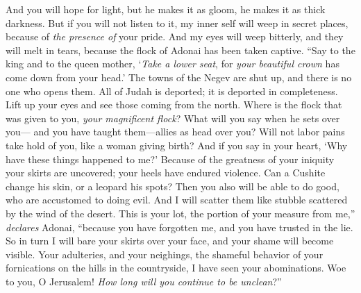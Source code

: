 \begin{biblechapter}
And you will hope for light, but he makes it as gloom, 
he makes it as thick darkness.
\verse But if you will not listen to it, 
my inner self will weep in secret places, 
because of \textit{the presence of} your pride. 
And my eyes will weep bitterly, 
and they will melt in tears, 
because the flock of Adonai has been taken captive.
 “Say to the king and to the queen mother, ‘\textit{Take a lower seat}, 
for \textit{your beautiful crown} has come down from your head.’
\verse The towns of the Negev are shut up, 
and there is no one who opens them. 
All of Judah is deported; 
it is deported in completeness.
\verse Lift up your eyes 
and see those coming from the north. 
Where is the flock that was given to you, 
\textit{your magnificent flock}?
\verse What will you say when he sets over you— 
and you have taught them—allies as head over you? 
Will not labor pains take hold of you, 
like a woman giving birth?
\verse And if you say in your heart, 
‘Why have these things happened to me?’ 
Because of the greatness of your iniquity your skirts are uncovered; 
your heels have endured violence.
\verse Can a Cushite change his skin, 
or a leopard his spots? 
Then you also will be able to do good, 
who are accustomed to doing evil.
\verse And I will scatter them 
like stubble scattered by the wind of the desert.
\verse This is your lot, 
the portion of your measure from me,” \textit{declares} Adonai, 
“because you have forgotten me, 
and you have trusted in the lie.
\verse So in turn I will bare your skirts over your face, 
and your shame will become visible.
\verse Your adulteries, and your neighings, 
the shameful behavior of your fornications 
on the hills in the countryside, 
I have seen your abominations. 
Woe to you, O Jerusalem! 
\textit{How long will you continue to be unclean}?”
\end{biblechapter}


